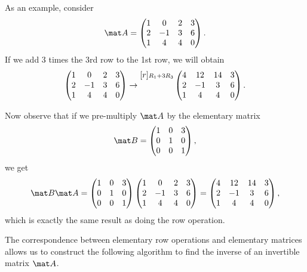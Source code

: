 \begin{example}
    As an example, consider \[\mat A = \begin{pmatrix}1 & 0 & 2 & 3 \\ 2 & -1 & 3 & 6 \\ 1 & 4 & 4 & 0\end{pmatrix}.\] If we add 3 times the 3rd row to the 1st row, we will obtain \[\begin{pmatrix}1 & 0 & 2 & 3 \\ 2 & -1 & 3 & 6 \\ 1 & 4 & 4 & 0\end{pmatrix} \rightarrow \begin{matrix}[r]\scriptstyle R_1 + 3R_3 \\ \scriptstyle \\ \scriptstyle\end{matrix} \begin{pmatrix}4 & 12 & 14 & 3 \\ 2 & -1 & 3 & 6 \\ 1 & 4 & 4 & 0\end{pmatrix}.\]

    Now observe that if we pre-multiply $\mat A$ by the elementary matrix \[\mat B = \begin{pmatrix}1 & 0 & 3 \\ 0 & 1 & 0 \\ 0 & 0 & 1\end{pmatrix},\] we get \[\mat B \mat A = \begin{pmatrix}1 & 0 & 3 \\ 0 & 1 & 0 \\ 0 & 0 & 1\end{pmatrix} \begin{pmatrix}1 & 0 & 2 & 3 \\ 2 & -1 & 3 & 6 \\ 1 & 4 & 4 & 0\end{pmatrix} = \begin{pmatrix}4 & 12 & 14 & 3 \\ 2 & -1 & 3 & 6 \\ 1 & 4 & 4 & 0\end{pmatrix},\] which is exactly the same result as doing the row operation.
\end{example}

The correspondence between elementary row operations and elementary matrices allows us to construct the following algorithm to find the inverse of an invertible matrix $\mat A$.

